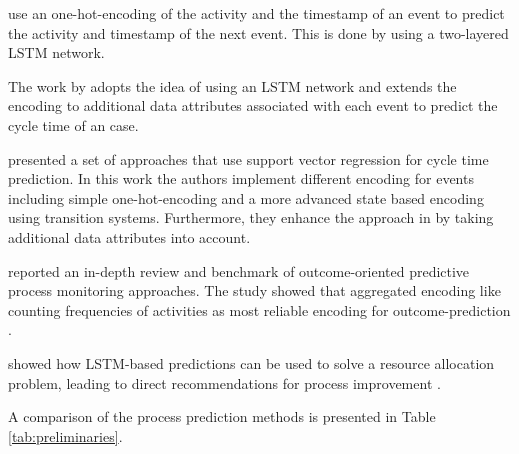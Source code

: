 \citeauthor{DBLP:conf/caise/TaxVRD17} use an one-hot-encoding of the activity and the timestamp of an event to predict the activity and timestamp of the next event.
This is done by using a two-layered LSTM network\cite{DBLP:conf/caise/TaxVRD17}.


The work by \citeauthor{DBLP:conf/ssci/NavarinVPS17} adopts the idea of using an LSTM network \cite{DBLP:conf/caise/TaxVRD17} and extends the encoding to additional data attributes associated with each event\cite{DBLP:conf/ssci/NavarinVPS17} to predict the cycle time of an case.

\citeauthor{DBLP:journals/computing/PolatoSBL18} presented a set of approaches that use support vector regression for cycle time prediction\cite{DBLP:journals/computing/PolatoSBL18}.
In this work the authors implement different encoding for events including simple one-hot-encoding and a more advanced state based encoding using transition systems.
Furthermore, they enhance the approach in  \cite{DBLP:journals/is/AalstSS11} by taking additional data attributes into account.

\citeauthor{DBLP:journals/tkdd/TeinemaaDRM19} reported an in-depth review and benchmark of outcome-oriented predictive process monitoring approaches.
The study showed that aggregated encoding like counting frequencies of activities as most reliable encoding for outcome-prediction \cite{DBLP:journals/tkdd/TeinemaaDRM19}.

\citeauthor{DBLP:conf/icpm/ParkS19} showed how LSTM-based predictions can be used to solve a resource allocation problem, leading to direct recommendations for process improvement \cite{DBLP:conf/icpm/ParkS19}.

A comparison of the process prediction methods is presented in Table \ref{tab:preliminaries}.


